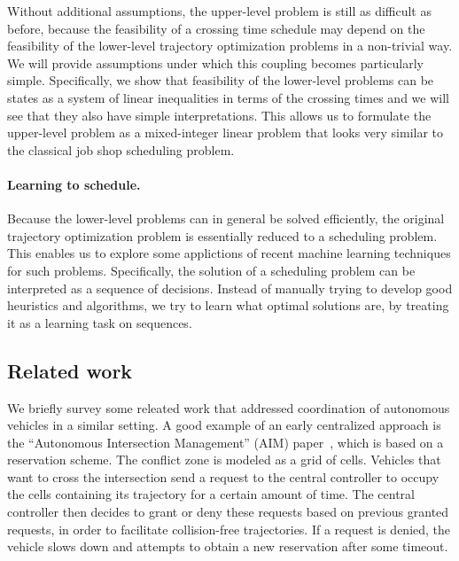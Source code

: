 \documentclass[a4paper]{report}
\theoremstyle{definition}
\theoremstyle{plain}
\begin{document}
Without additional assumptions, the upper-level problem is still as difficult as
before, because the feasibility of a crossing time schedule may depend on the
feasibility of the lower-level trajectory optimization problems in a non-trivial
way.
%
We will provide assumptions under which this coupling becomes particularly
simple.
%
Specifically, we show that feasibility of the lower-level problems can be states
as a system of linear inequalities in terms of the crossing times and we will
see that they also have simple interpretations.
%
This allows us to formulate the upper-level problem as a mixed-integer linear
problem that looks very similar to the classical job shop scheduling problem.

\paragraph{Learning to schedule.}

Because the lower-level problems can in general be solved efficiently, the
original trajectory optimization problem is essentially reduced to a scheduling
problem.
%
This enables us to explore some applictions of recent machine learning
techniques for such problems.
%
Specifically, the solution of a scheduling problem can be interpreted as a
sequence of decisions.
%
Instead of manually trying to develop good heuristics and algorithms, we try to
learn what optimal solutions are, by treating it as a learning task on
sequences.


\subsection{Related work}

We briefly survey some releated work that addressed coordination of autonomous
vehicles in a similar setting.
%
A good example of an early centralized approach
is the ``Autonomous Intersection Management'' (AIM)
paper~\cite{dresnerMultiagentApproachAutonomous2008}, which is based on a
reservation scheme. The conflict zone is modeled as a grid of cells. Vehicles
that want to cross the intersection send a request to the central controller to
occupy the cells containing its trajectory for a certain amount of time. The
central controller then decides to grant or deny these requests based on
previous granted requests, in order to facilitate collision-free trajectories.
If a request is denied, the vehicle slows down and attempts to obtain a new
reservation after some timeout.

\end{document}
